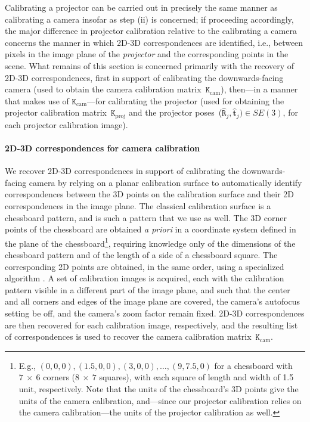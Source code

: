 \documentclass[review]{elsarticle}
\begin{document}
Calibrating a projector \cite{moreno2012simple,zhang2009projector,zhang2006novel} can be carried out in precisely the same manner as calibrating a camera insofar as step (ii) is concerned; if proceeding accordingly, the major difference in projector calibration relative to the calibrating a camera concerns the manner in which 2D-3D correspondences are identified, i.e., between pixels in the image plane of the \textit{projector} and the corresponding points in the scene. What remains of this section is concerned primarily with the recovery of 2D-3D correspondences, first in support of calibrating the downwards-facing camera (used to obtain the camera calibration matrix~$\mathtt{K}_\text{cam}$), then---in a manner that makes use of $\mathtt{K}_\text{cam}$---for calibrating the projector (used for obtaining the projector calibration matrix~$\mathtt{K}_\text{proj}$ and the projector poses~($\hat{\mathtt{R}}_j, \hat{\mathbf{t}}_j) \in SE(3)$, for each projector calibration image).

\paragraph{2D-3D correspondences for camera calibration} We recover 2D-3D correspondences in support of calibrating the downwards-facing camera by relying on a planar calibration surface to automatically identify correspondences between the 3D points on the calibration surface and their 2D correspondences in the image plane. The classical calibration surface is a chessboard pattern, and is such a pattern that we use as well. The 3D corner points of the chessboard are obtained \textit{a priori} in a coordinate system defined in the plane of the chessboard\footnote{E.g., $(0,0,0), (1.5,0,0), (3,0,0), \dots, (9,7.5,0)$ for a chessboard with $7~\times{}~6$ corners ($8~\times{}~7$ squares), with each square of length and width of 1.5 unit, respectively. Note that the units of the chessboard's 3D points give the units of the camera calibration, and---since our projector calibration relies on the camera calibration---the units of the projector calibration as well.}, requiring knowledge only of the dimensions of the chessboard pattern and of the length of a side of a chessboard square. The corresponding 2D points are obtained, in the same order, using a specialized algorithm \cite{bradski2000opencv}. A set of calibration images is acquired, each with the calibration pattern visible in a different part of the image plane, and such that the center and all corners and edges of the image plane are covered, the camera's autofocus setting be off, and the camera's zoom factor remain fixed. 2D-3D correspondences are then recovered for each calibration image, respectively, and the resulting list of correspondences is used to recover the camera calibration matrix~$\mathtt{K}_\text{cam}$. 
\end{document}
